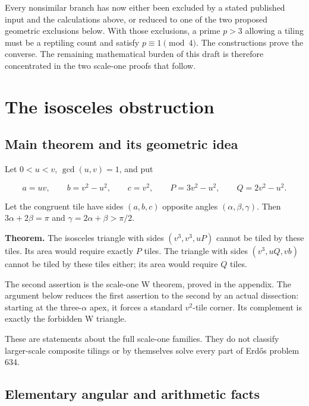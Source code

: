 \documentclass[
  11pt,
  a4paper,
]{article}
\begin{document}
Every nonsimilar branch has now either been excluded by a stated
published input and the calculations above, or reduced to one of the
two proposed geometric exclusions below. With those exclusions, a
prime $p>3$ allowing a tiling must be a reptiling count and satisfy
$p\equiv1\pmod4$. The constructions prove the converse. The remaining
mathematical burden of this draft is therefore concentrated in the two
scale-one proofs that follow.

\hypertarget{the-isosceles-obstruction}{%
\section{The isosceles obstruction}\label{the-isosceles-obstruction}}

\hypertarget{main-theorem-and-its-geometric-idea}{%
\subsection{Main theorem and its geometric
idea}\label{main-theorem-and-its-geometric-idea}}

Let \(0<u<v\), \(\gcd(u,v)=1\), and put

\[
a=uv,\qquad b=v^2-u^2,\qquad c=v^2,\qquad
P=3v^2-u^2,\qquad Q=2v^2-u^2.
\]

Let the congruent tile have sides \((a,b,c)\) opposite angles
\((\alpha,\beta,\gamma)\). Then \(3\alpha+2\beta=\pi\) and
\(\gamma=2\alpha+\beta>\pi/2\).

\textbf{Theorem.} The isosceles triangle with sides \((v^3,v^3,uP)\)
cannot be tiled by these tiles. Its area would require exactly \(P\)
tiles. The triangle with sides \((v^3,uQ,vb)\) cannot be tiled by these
tiles either; its area would require \(Q\) tiles.

The second assertion is the scale-one W theorem, proved in the appendix.
The argument below reduces the first assertion to the second by an
actual dissection: starting at the three-\(\alpha\) apex, it forces a
standard \(v^2\)-tile corner. Its complement is exactly the forbidden W
triangle.

These are statements about the full scale-one families. They do not
classify larger-scale composite tilings or by themselves solve every
part of Erdős problem 634.

\hypertarget{elementary-angular-and-arithmetic-facts}{%
\subsection{Elementary angular and arithmetic
facts}\label{elementary-angular-and-arithmetic-facts}}
\end{document}
